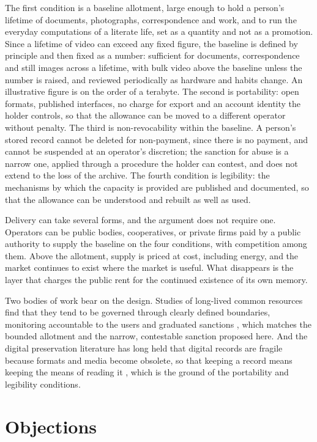 \documentclass[11pt]{article}
\begin{document}
The first condition is a baseline allotment, large enough to hold a person's lifetime of documents, photographs, correspondence and work, and to run the everyday computations of a literate life, set as a quantity and not as a promotion. Since a lifetime of video can exceed any fixed figure, the baseline is defined by principle and then fixed as a number: sufficient for documents, correspondence and still images across a lifetime, with bulk video above the baseline unless the number is raised, and reviewed periodically as hardware and habits change. An illustrative figure is on the order of a terabyte. The second is portability: open formats, published interfaces, no charge for export and an account identity the holder controls, so that the allowance can be moved to a different operator without penalty. The third is non-revocability within the baseline. A person's stored record cannot be deleted for non-payment, since there is no payment, and cannot be suspended at an operator's discretion; the sanction for abuse is a narrow one, applied through a procedure the holder can contest, and does not extend to the loss of the archive. The fourth condition is legibility: the mechanisms by which the capacity is provided are published and documented, so that the allowance can be understood and rebuilt as well as used.

Delivery can take several forms, and the argument does not require one. Operators can be public bodies, cooperatives, or private firms paid by a public authority to supply the baseline on the four conditions, with competition among them. Above the allotment, supply is priced at cost, including energy, and the market continues to exist where the market is useful. What disappears is the layer that charges the public rent for the continued existence of its own memory.

Two bodies of work bear on the design. Studies of long-lived common resources find that they tend to be governed through clearly defined boundaries, monitoring accountable to the users and graduated sanctions \cite{ostrom}, which matches the bounded allotment and the narrow, contestable sanction proposed here. And the digital preservation literature has long held that digital records are fragile because formats and media become obsolete, so that keeping a record means keeping the means of reading it \cite{rothenberg}, which is the ground of the portability and legibility conditions.

\section{Objections}
\end{document}

